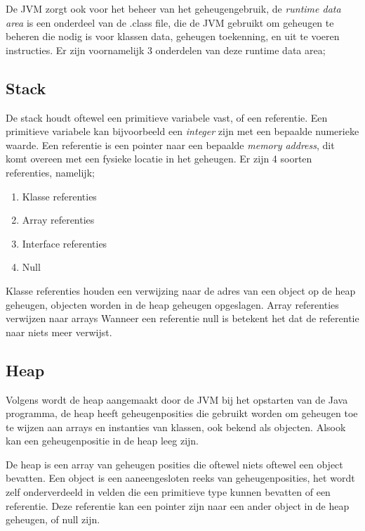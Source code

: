 De JVM zorgt ook voor het beheer van het geheugengebruik, de \textit{runtime data area} is een onderdeel van de .class file, die de JVM gebruikt om geheugen te beheren die nodig is voor klassen data, geheugen toekenning, en uit te voeren instructies.\autocite{Putten2022}
Er zijn voornamelijk 3 onderdelen van deze runtime data area;

\subsection{Stack}
\label{sec:Stack}

De stack houdt oftewel een primitieve variabele vast, of een referentie.
Een primitieve variabele kan bijvoorbeeld een \textit{integer} zijn met een bepaalde numerieke waarde.
Een referentie is een pointer naar een bepaalde \textit{memory address}, dit komt overeen met een fysieke locatie in het geheugen.\autocite{Huck1993}
Er zijn 4 soorten referenties, namelijk;
\begin{enumerate}
    \item Klasse referenties
    \item Array referenties
    \item Interface referenties
    \item Null
\end{enumerate}
Klasse referenties houden een verwijzing naar de adres van een object op de heap geheugen, objecten worden in de heap geheugen opgeslagen.
Array referenties verwijzen naar arrays
Wanneer een referentie null is betekent het dat de referentie naar niets meer verwijst.

\subsection{Heap}
\label{sec:heap}
Volgens \textcite{Grgic2018} wordt de heap aangemaakt door de JVM bij het opstarten van de Java programma, de heap heeft geheugenposities die gebruikt worden om geheugen toe te wijzen aan arrays en instanties van klassen, ook bekend als objecten.
Alsook kan een geheugenpositie in de heap leeg zijn.

De heap is een array van geheugen posities die oftewel niets oftewel een object bevatten.
Een object is een aaneengesloten reeks van geheugenposities, het wordt zelf onderverdeeld in velden die een primitieve type kunnen bevatten of een referentie.
Deze referentie kan een pointer zijn naar een ander object in de heap geheugen, of null zijn.\autocite{Bruno2018}
